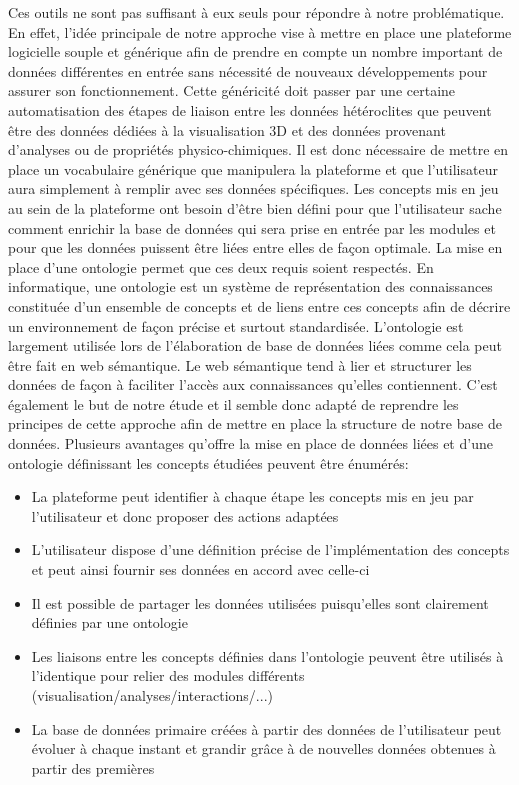 Ces outils ne sont pas suffisant à eux seuls pour répondre à notre problématique. En effet, l'idée principale de notre approche vise à mettre en place une plateforme logicielle souple et générique afin de prendre en compte un nombre important de données différentes en entrée sans nécessité de nouveaux développements pour assurer son fonctionnement. Cette généricité doit passer par une certaine automatisation des étapes de liaison entre les données hétéroclites que peuvent être des données dédiées à la visualisation 3D et des données provenant d'analyses ou de propriétés physico-chimiques.
Il est donc nécessaire de mettre en place un vocabulaire générique que manipulera la plateforme et que l'utilisateur aura simplement à remplir avec ses données spécifiques. Les concepts mis en jeu au sein de la plateforme ont besoin d'être bien défini pour que l'utilisateur sache comment enrichir la base de données qui sera prise en entrée par les modules et pour que les données puissent être liées entre elles de façon optimale. La mise en place d'une ontologie permet que ces deux requis soient respectés. En informatique, une ontologie est un système de représentation des connaissances constituée d'un ensemble de concepts et de liens entre ces concepts afin de décrire un environnement de façon précise et surtout standardisée. L'ontologie est largement utilisée lors de l'élaboration de base de données liées comme cela peut être fait en web sémantique. Le web sémantique tend à lier et structurer les données de façon à faciliter l'accès aux connaissances qu'elles contiennent. C'est également le but de notre étude et il semble donc adapté de reprendre les principes de cette approche afin de mettre en place la structure de notre base de données. Plusieurs avantages qu'offre la mise en place de données liées et d'une ontologie définissant les concepts étudiées peuvent être énumérés:

\begin{itemize}
	\item La plateforme peut identifier à chaque étape les concepts mis en jeu par l'utilisateur et donc proposer des actions adaptées
	\item L'utilisateur dispose d'une définition précise de l'implémentation des concepts et peut ainsi fournir ses données en accord avec celle-ci
	\item Il est possible de partager les données utilisées puisqu'elles sont clairement définies par une ontologie
	\item Les liaisons entre les concepts définies dans l'ontologie peuvent être utilisés à l'identique pour relier des modules différents (visualisation/analyses/interactions/...)
	\item La base de données primaire créées à partir des données de l'utilisateur peut évoluer à chaque instant et grandir grâce à de nouvelles données obtenues à partir des premières
\end{itemize}

